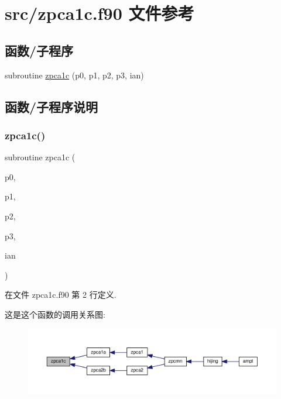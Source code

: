 \hypertarget{zpca1c_8f90}{}\section{src/zpca1c.f90 文件参考}
\label{zpca1c_8f90}
\subsection*{函数/子程序}
\begin{DoxyCompactItemize}
\item 
subroutine \mbox{\hyperlink{zpca1c_8f90_a3b929e0a0438b0653c2b327d218d1a53}{zpca1c}} (p0, p1, p2, p3, ian)
\end{DoxyCompactItemize}


\subsection{函数/子程序说明}
\mbox{\label{zpca1c_8f90_a3b929e0a0438b0653c2b327d218d1a53}} 
\subsubsection{\texorpdfstring{zpca1c()}{zpca1c()}}
{\footnotesize\ttfamily subroutine zpca1c (\begin{DoxyParamCaption}\item[{}]{p0,  }\item[{}]{p1,  }\item[{}]{p2,  }\item[{}]{p3,  }\item[{}]{ian }\end{DoxyParamCaption})}



在文件 zpca1c.\+f90 第 2 行定义.

这是这个函数的调用关系图\+:
\nopagebreak
\begin{figure}[H]
\begin{center}
\leavevmode
\includegraphics[width=350pt]{zpca1c_8f90_a3b929e0a0438b0653c2b327d218d1a53_icgraph}
\end{center}
\end{figure}
